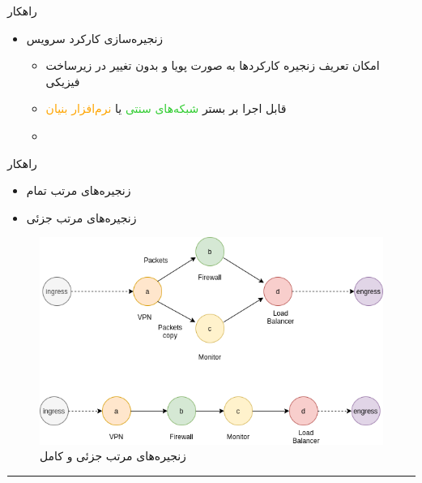 \documentclass[dvipsnames]{beamer}
\makeatletter
\newcommand{\RTList}{\raggedleft\rightskip\@totalleftmargin}
\makeatother
\begin{document}
\begin{persian}
	\begin{frame}{راهکار }
		\begin{itemize}\RTList{}
			\justifying
			\item زنجیره‌سازی کارکرد سرویس
						\begin{itemize}\RTList{}
							\item امکان تعریف زنجیره کارکردها به صورت پویا و بدون تغییر در زیرساخت فیزیکی
							\item قابل اجرا بر بستر \textcolor{LimeGreen}{شبکه‌های سنتی} یا \textcolor{Orange}{نرم‌افزار بنیان}
							\item {}
						\end{itemize}
		\end{itemize}
	\end{frame}

	\begin{frame}{راهکار }
		\begin{itemize}\RTList{}
			\justifying
			\item زنجیره‌های مرتب تمام
			\item زنجیره‌های مرتب جزئی
		\end{itemize}
		\begin{center}\begin{figure}
				\includegraphics[scale=0.3]{images/partially-totally-sfc.png}
				\caption{زنجیره‌های مرتب جزئی و کامل}
				\vspace*{-1cm}
		\end{figure}\end{center}
		\begin{latin}
		\noindent\rule{1cm}{0.4pt}\\
		\tiny{}
		\end{latin}
	\end{frame}


\end{persian}
\end{document}
